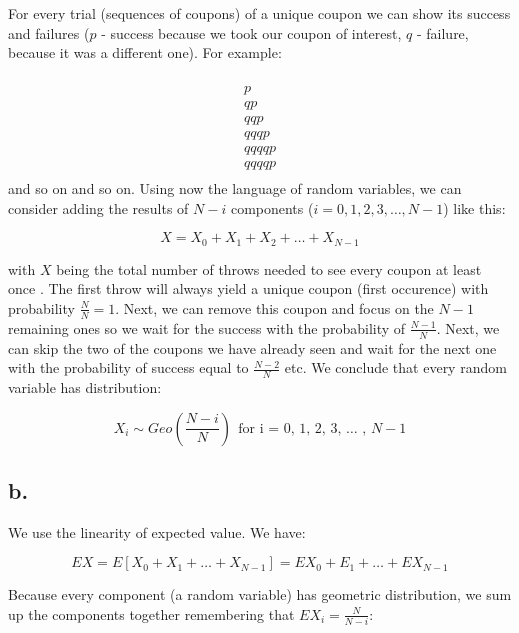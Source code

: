 \documentclass{article}
\begin{document}
For every trial (sequences of coupons) of a unique coupon we can show its success and failures
(\(p\) - success because we took our coupon of interest, \(q\) - failure, because it was a different one).
For example:

\begin{multline*}
     \\
    p \\ 
    qp \\ 
    qqp \\ 
    qqqp \\ 
    qqqqp \\ 
    qqqqp \\ 
\end{multline*}
and so on and so on. Using now the language of random variables, we can consider adding the results
of \(N-i\) components (\(i = 0, 1, 2, 3, \dots, N-1\)) like this:

\begin{equation*}
    X = X_{0} + X_{1} + X_{2} + \dots + X_{N-1}
\end{equation*}

with \(X\) being the total number of throws needed to see every coupon at least once
. The first throw will always yield a unique coupon (first occurence) with probability \(\frac{N}{N} = 1\).
Next, we can remove this coupon and focus on the \(N-1\) remaining ones so we wait for the success with the probability
of \(\frac{N-1}{N}\). Next, we can skip the two of the coupons we have already seen and wait for the next one
with the probability of success equal to \(\frac{N-2}{N}\) etc. We conclude that every random variable has
distribution:

\begin{equation*}
    X_{i} \sim Geo(\frac{N-i}{N}) \ \ \mbox{for i = 0, 1, 2, 3, \(\dots\) , \(N-1\)}
\end{equation*}

\subsection*{b.}

We use the linearity of expected value. We have:

\begin{equation*}
    EX = E[X_{0} + X_{1} + \dots + X_{N-1}] = EX_{0} + E_{1} + \dots + EX_{N-1}
\end{equation*}

Because every component (a random variable) has geometric distribution, we sum up the components together
remembering that \(EX_{i} = \frac{N}{N - i} \):
\end{document}
